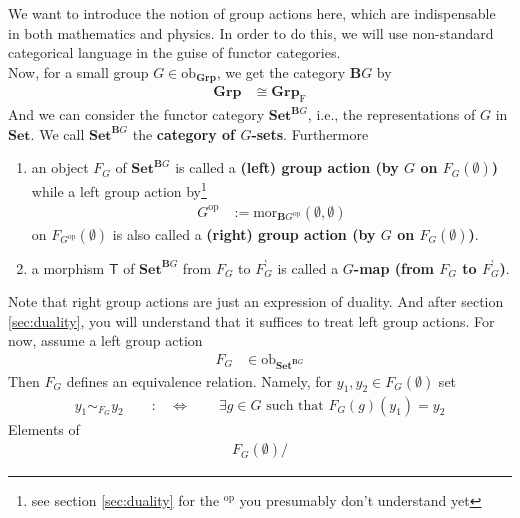 \begin{exa}
\label{exa:algstruct3}
We want to introduce the notion of group actions here, which are indispensable in both mathematics and physics.
In order to do this, we will use non-standard categorical language in the guise of functor categories.
\\
Now, for a small group $G \in \mathrm{ob}_{\mathbf{Grp}}$, we get the category $\mathbf{B}G$ by
\begin{align*}
  \mathbf{Grp}
  &\cong
  \mathbf{Grp}_{\mathrm{F}}
\end{align*}
And we can consider the functor category $\mathbf{Set}^{\mathbf{B}G}$, i.e., the representations of $G$ in $\mathbf{Set}$.
We call $\mathbf{Set}^{\mathbf{B}G}$ the \textbf{category of $G$-sets}.
Furthermore
\begin{enumerate}
\item[$\bullet$]
an object $F_{G}$ of $\mathbf{Set}^{\mathbf{B}G}$ is called a \textbf{(left) group action (by $G$ on $F_{G}(\emptyset)$)} while a left group action by\footnote{see section \ref{sec:duality} for the {\glqq}$^{\mathrm{op}}${\grqq} you presumably don't understand yet}
\begin{align*}
  G^{\textrm{op}}
  &:=
  \mathrm{mor}_{\mathbf{B}G^{\textrm{op}}}
  \left(
    \emptyset,
    \emptyset
  \right)
\end{align*}
on $F_{G^{\textrm{op}}}(\emptyset)$ is also called a \textbf{(right) group action (by $G$ on $F_{G}(\emptyset)$)}.
\item[$\bullet$]
a morphism $\mathsf{T}$ of $\mathbf{Set}^{\mathbf{B}G}$ from $F_{G}$ to $F_{G}^{\backprime}$ is called a \textbf{$G$-map (from $F_{G}$ to $F_{G}^{\backprime}$)}.
\end{enumerate}
Note that right group actions are just an expression of duality.
And after section \ref{sec:duality}, you will understand that it suffices to treat left group actions.
For now, assume a left group action
\begin{align*}
  F_{G}
  &\in
  \mathrm{ob}_{\mathbf{Set}^{\mathbf{B}G}}
\end{align*}
Then $F_{G}$ defines an equivalence relation.
Namely, for $y_{1},y_{2} \in F_{G}(\emptyset)$ set
\begin{align*}
  y_{1}
  \sim_{F_{G}}
  y_{2}
  \qquad
  :&\Leftrightarrow
  \qquad
  \exists
  g
  \in
  G
  \text{ such that }
  F_{G}(g)(y_{1})
  =
  y_{2}
\end{align*}
Elements of
\begin{align*}
  F_{G}(\emptyset)
  \slash

\end{align*}
\end{exa}

